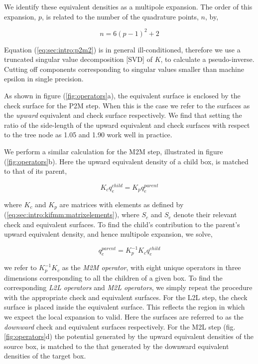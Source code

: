\documentclass{IEEEcsmag}
\begin{document}
We identify these equivalent densities as a multipole expansion. The order of this expansion, $p$, is related to the number of the quadrature points, $n$, by,

\begin{equation}
	n = 6(p-1)^2+2
	\label{eq:sec:intro:kifmm:nquads}
\end{equation}

Equation (\ref{eq:sec:intro:p2m2}) is in general ill-conditioned, therefore we use a truncated singular value decomposition [SVD] of $K$, to calculate a pseudo-inverse. Cutting off components corresponding to singular values smaller than machine epsilon in single precision.

As shown in figure (\ref{fig:operators}a), the equivalent surface is enclosed by the check surface for the P2M step. When this is the case we refer to the surfaces as the \textit{upward} equivalent and check surface respectively. We find that setting the ratio of the side-length of the upward equivalent and check surfaces with respect to the tree node as 1.05 and 1.90 work well in practice.

We perform a similar calculation for the M2M step, illustrated in figure (\ref{fig:operators}b). Here the upward equivalent density of a child box, is matched to that of its parent,

\begin{equation}
	K_c q_e^{child} = K_p q_e ^{parent}
\end{equation}

where $K_c$ and $K_p$ are matrices with elements as defined by (\ref{eq:sec:intro:kifmm:matrixelements}), where $S_c$ and $S_e$ denote their relevant check and equivalent surfaces. To find the child's contribution to the parent's upward equivalent density, and hence multipole expansion, we solve,

\begin{equation}
	q_e^{parent} = K_p^{-1}K_c q_e^{child}
\end{equation}

we refer to $K_p^{-1}K_c$ as the \textit{M2M operator}, with eight unique operators in three dimensions corresponding to all the children of a given box. To find the corresponding \textit{L2L operators} and \textit{M2L operators}, we simply repeat the procedure with the appropriate check and equivalent surfaces. For the L2L step, the check surface is placed inside the equivalent surface. This reflects the region in which we expect the local expansion to valid. Here the surfaces are referred to as the \textit{downward} check and equivalent surfaces respectively. For the M2L step (fig. \ref{fig:operators}d) the potential generated by the upward equivalent densities of the source box, is matched to the that generated by the downward equivalent densities of the target box.
\end{document}
